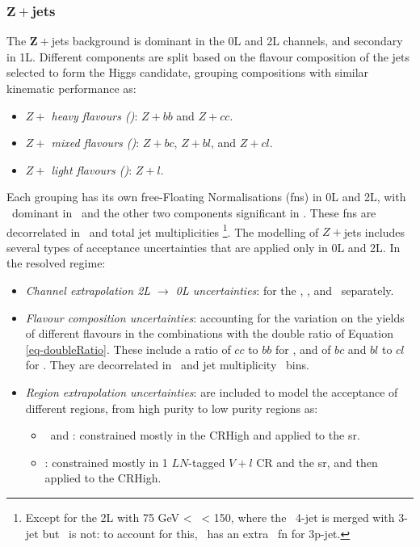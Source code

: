 \subsubsection{$\boldsymbol{Z+}$jets}
The $\boldsymbol{Z+}$jets background is dominant in the 0L and 2L channels, and secondary in 1L. Different components are split based on the flavour composition of the jets selected to form the Higgs candidate, grouping compositions with similar kinematic performance as:   
\begin{itemize}
    \item \textit{$Z+$ heavy flavours (\zhf)}: $Z+bb$ and $Z+cc$.
    \item \textit{$Z+$ mixed flavours (\zmf)}: $Z+bc$, $Z+bl$, and $Z+cl$.
    \item \textit{$Z+$ light flavours (\zlf)}: $Z+l$.
\end{itemize}
Each grouping has its own free-Floating Normalisations (\glspl{fn}) in 0L and 2L, with \zhf\ dominant in \vhb\ and the other two components significant in \vhc. These \glspl{fn} are decorrelated in \ptv\ and total jet multiplicities \nj\footnote{Except for the 2L with 75 GeV < \ptv\ < 150, where the \vhb\ 4-jet is merged with 3-jet but \vhc\ is not: to account for this, \vhb\ has an extra \zhf\ \gls{fn} for 3p-jet.}. The modelling of $Z+$jets includes several types of acceptance uncertainties that are applied only in 0L and 2L. In the resolved regime:
\begin{itemize}[leftmargin=*]
    \item \textit{Channel extrapolation 2L $\rightarrow$ 0L uncertainties}: for the \zhf, \zmf, and \zlf\ separately. 
    \item \textit{Flavour composition uncertainties}: accounting for the variation on the yields of different flavours in the combinations with the double ratio of Equation \ref{eq-doubleRatio}. These include a ratio of $cc$ to $bb$ for \zhf, and of $bc$ and $bl$ to $cl$ for \zmf. They are decorrelated in \ptv\ and jet multiplicity \nj\ bins. 
    \item \textit{Region extrapolation uncertainties}: are included to model the acceptance of different regions, from high purity to low purity regions as:
    \begin{itemize}
        \item \zhf\ and \zmf: constrained mostly in the CRHigh and applied to the \gls{sr}. 
        \item \zlf: constrained mostly in 1 $LN$-tagged $V+l$ CR and the \gls{sr}, and then applied to the CRHigh. %
    \end{itemize}
\end{itemize}

